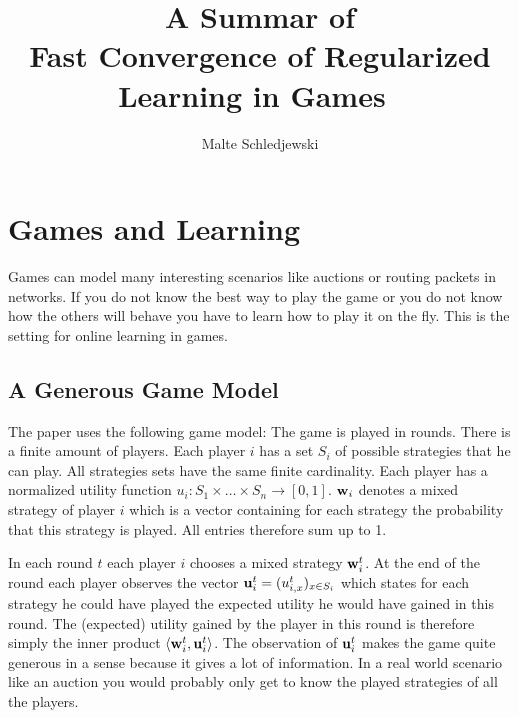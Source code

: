 \documentclass[a4paper]{article}
\title{A Summar of \\Fast Convergence of Regularized Learning in Games~\cite[]{2015arXiv150700407S}}
\author{Malte Schledjewski}
\theoremstyle{definition}
\newcommand{\mst}{\ensuremath{w}}
\renewcommand{\vec}[1]{\ensuremath{{\bf #1}}}
\newcommand{\dotp}[2]{\ensuremath{\left\langle #1, #2 \right\rangle}}
\begin{document}




\maketitle

\section{Games and Learning}

Games can model many interesting scenarios like auctions or routing
packets in networks.
If you do not know the best way to play the game or you do not know
how the others will behave you have to learn how to play it
on the fly.
This is the setting for online learning in games.




\subsection{A Generous Game Model}
The paper uses the following game model:
The game is played in rounds.
There is a finite amount of players.
Each player $i$ has a set $S_i$ of possible strategies that he can play.
All strategies sets have the same finite cardinality.
Each player has a normalized utility function
$u_i: S_1\times \ldots \times S_n \rightarrow [0,1]$.
 $\vec{w}_i$ denotes a mixed strategy of player $i$ which is a
 vector containing for each strategy the probability that this
 strategy is played. All entries therefore sum up to 1. 

In each round $t$ each player $i$ chooses a mixed strategy $\vec{\mst}_i^t$.
At the end of the round each player observes the vector $\vec{u}_i^t =
(u_{i,x}^t)_{x\in S_i}$
which states for each strategy he could have played the expected
utility he would have gained in this round.
The (expected) utility gained by the player in this round is therefore simply the
inner product $\dotp{ \vec{\mst}_i^t}{\vec{u}_i^t}$.
The observation of $\vec{u}_i^t$ makes the game quite generous in a sense because it gives a lot
of information. In a real world scenario like an auction you would
probably only get to know the played strategies of all the players.
\end{document}
